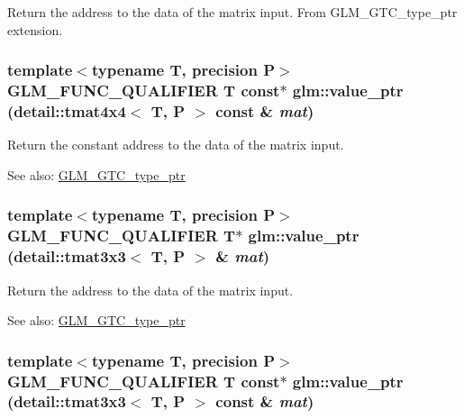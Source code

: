 Return the address to the data of the matrix input. From GLM\_\-GTC\_\-type\_\-ptr extension. \hypertarget{group__gtc__type__ptr_gcb2a7024434ab32998c6ade8ec0c0e4b}{
\subsubsection[value\_\-ptr]{\setlength{\rightskip}{0pt plus 5cm}template$<$typename T, precision P$>$ GLM\_\-FUNC\_\-QUALIFIER T const$\ast$ glm::value\_\-ptr (detail::tmat4x4$<$ T, P $>$ const \& {\em mat})}}
\label{group__gtc__type__ptr_gcb2a7024434ab32998c6ade8ec0c0e4b}


Return the constant address to the data of the matrix input. \begin{Desc}
\item[See also:]\hyperlink{group__gtc__type__ptr}{GLM\_\-GTC\_\-type\_\-ptr} \end{Desc}
\hypertarget{group__gtc__type__ptr_ge90c54e1a61d5ad0417d3c1a7800dfdc}{
\subsubsection[value\_\-ptr]{\setlength{\rightskip}{0pt plus 5cm}template$<$typename T, precision P$>$ GLM\_\-FUNC\_\-QUALIFIER T$\ast$ glm::value\_\-ptr (detail::tmat3x3$<$ T, P $>$ \& {\em mat})}}
\label{group__gtc__type__ptr_ge90c54e1a61d5ad0417d3c1a7800dfdc}


Return the address to the data of the matrix input. \begin{Desc}
\item[See also:]\hyperlink{group__gtc__type__ptr}{GLM\_\-GTC\_\-type\_\-ptr} \end{Desc}
\hypertarget{group__gtc__type__ptr_g78aceb3dc479cf7745bc5a0d9f751504}{
\subsubsection[value\_\-ptr]{\setlength{\rightskip}{0pt plus 5cm}template$<$typename T, precision P$>$ GLM\_\-FUNC\_\-QUALIFIER T const$\ast$ glm::value\_\-ptr (detail::tmat3x3$<$ T, P $>$ const \& {\em mat})}}
\label{group__gtc__type__ptr_g78aceb3dc479cf7745bc5a0d9f751504}



